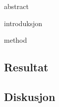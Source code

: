 \documentclass [12pt]{article}
\begin{document}
 {abstract}

 {introduksjon}

 {method}

\subsection {Resultat}

\subsection {Diskusjon}



\end{document}
